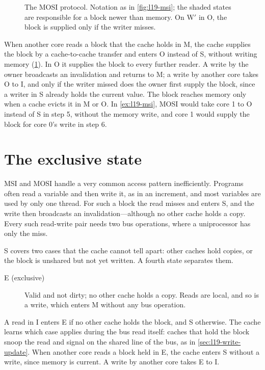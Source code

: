 \documentclass[../main.tex]{subfiles}
\begin{document}
\begin{figure}[htbp]
  \centering
  
  \caption{The MOSI protocol.  Notation as in \cref{fig:l19-msi}; the shaded
    states are responsible for a block newer than memory.  On W$'$ in O, the
    block is supplied only if the writer misses.}
  \label{fig:l19-mosi}
\end{figure}

When another core reads a block that the cache holds in M, the cache supplies
the block by a cache-to-cache transfer and enters O instead of S, without
writing memory (\cref{fig:l19-mosi}).  In O it supplies the block to every
further reader.  A write by the owner broadcasts an invalidation and returns
to M; a write by another core takes O to I, and only if the writer missed
does the owner first supply the block, since a writer in S already holds the
current value.  The block reaches memory only when a
cache evicts it in M or O.  In
\cref{ex:l19-msi}, MOSI would take core 1 to O instead of S in step 5,
without the memory write, and core 1 would supply the block for core 0's
write in step 6.

\section{The exclusive state}
\label{sec:l19-mesi}

MSI and MOSI handle a very common access pattern
inefficiently.  Programs often read a
variable and then write it, as in an increment, and most variables are used
by only one thread.  For such a block the read misses and enters S, and the write then broadcasts an
invalidation---although no other cache holds a copy.  Every such read-write
pair needs two bus operations, where a uniprocessor has only the miss.

S covers two cases that the cache cannot tell apart: other caches hold
copies, or the block is unshared but not yet written.  A fourth state
separates them.
\begin{description}
  \item[E (exclusive)] Valid and not dirty; no other cache holds a copy.
    Reads are local, and so is a write, which enters M without any bus
    operation.
\end{description}
A read in I enters E if no other cache holds the block, and S otherwise.  The
cache learns which case applies during the bus read itself: caches that hold
the block snoop the read and signal on the shared line of the bus, as in
\cref{sec:l19-write-update}.  When another core reads a block held in E, the
cache enters S without a write, since memory is current.  A write by another
core takes E to I.
\end{document}
